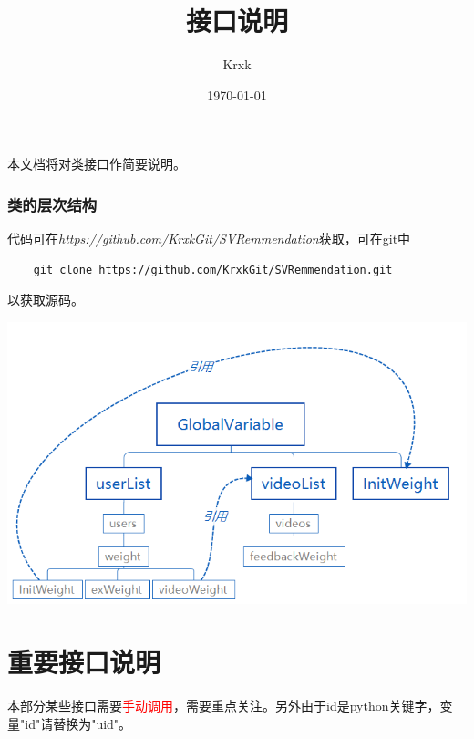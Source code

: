 \documentclass{article}
\begin{document}
\pagestyle{fancy}
\title{接口说明}
\author{Krxk}
\date{\today}
\maketitle


本文档将对类接口作简要说明。
\tableofcontents
\newpage
\section{类的层次结构}
代码可在\emph{https://github.com/KrxkGit/SVRemmendation}获取，可在git中
\begin{lstlisting}
    git clone https://github.com/KrxkGit/SVRemmendation.git
\end{lstlisting}
以获取源码。

\begin{center}
    \includegraphics[scale=0.8]{../类结构.png}
\end{center}

\part{重要接口说明}
本部分某些接口需要\textcolor{red}{手动调用}，需要重点关注。另外由于id是python关键字，变量"id"请替换为"uid"。
\end{document}
